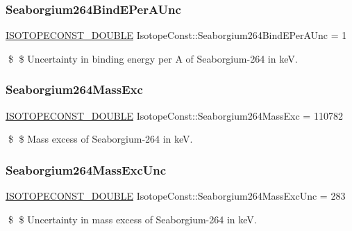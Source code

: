\subsubsection{\texorpdfstring{Seaborgium264\+Bind\+E\+Per\+A\+Unc}{Seaborgium264BindEPerAUnc}}
{\footnotesize\ttfamily \mbox{\hyperlink{group___isotope_const-_macros_ga8f45a7272ce02c0b4c65c44636ed719a}{I\+S\+O\+T\+O\+P\+E\+C\+O\+N\+S\+T\+\_\+\+D\+O\+U\+B\+LE}} Isotope\+Const\+::\+Seaborgium264\+Bind\+E\+Per\+A\+Unc = 1}

\$ \$ Uncertainty in binding energy per A of Seaborgium-\/264 in keV. \mbox{\label{group___isotope_const-_seaborgium-_sg264_ga6d27b4d1f8e35dda1bb089cdeadf5423}} 
\subsubsection{\texorpdfstring{Seaborgium264\+Mass\+Exc}{Seaborgium264MassExc}}
{\footnotesize\ttfamily \mbox{\hyperlink{group___isotope_const-_macros_ga8f45a7272ce02c0b4c65c44636ed719a}{I\+S\+O\+T\+O\+P\+E\+C\+O\+N\+S\+T\+\_\+\+D\+O\+U\+B\+LE}} Isotope\+Const\+::\+Seaborgium264\+Mass\+Exc = 110782}

\$ \$ Mass excess of Seaborgium-\/264 in keV. \mbox{\label{group___isotope_const-_seaborgium-_sg264_ga48c6036534b11fd4f521de1ad143c38a}} 
\subsubsection{\texorpdfstring{Seaborgium264\+Mass\+Exc\+Unc}{Seaborgium264MassExcUnc}}
{\footnotesize\ttfamily \mbox{\hyperlink{group___isotope_const-_macros_ga8f45a7272ce02c0b4c65c44636ed719a}{I\+S\+O\+T\+O\+P\+E\+C\+O\+N\+S\+T\+\_\+\+D\+O\+U\+B\+LE}} Isotope\+Const\+::\+Seaborgium264\+Mass\+Exc\+Unc = 283}

\$ \$ Uncertainty in mass excess of Seaborgium-\/264 in keV. \mbox{\label{group___isotope_const-_seaborgium-_sg264_gaa0f4b0fafad886f5d8efb8b7280f0dda}} 

